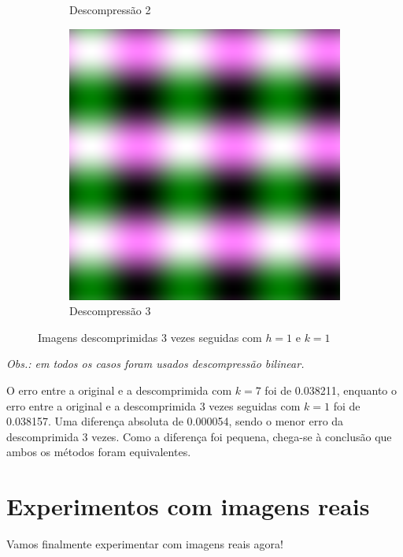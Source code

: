 \documentclass{article}
\begin{document}
\begin{figure}[ht]
\begin{subfigure}{0.3\textwidth}
    \caption{Descompressão 2}
  \end{subfigure}%
  \hfill
  \begin{subfigure}{0.3\textwidth}
    \centering
    \includegraphics[width=\textwidth]{senoidal/decompress3vezes/decompressed3.png}
    \caption{Descompressão 3}
  \end{subfigure}%
  \caption{Imagens descomprimidas 3 vezes seguidas com $h=1$ e $k=1$}
\end{figure}

\newpage

\textit{Obs.: em todos os casos foram usados descompressão bilinear.}

O erro entre a original e a descomprimida com $k=7$ foi de 0.038211, enquanto
o erro entre a original e a descomprimida 3 vezes seguidas com $k=1$ foi de
0.038157. Uma diferença absoluta de 0.000054, sendo o menor erro da descomprimida
3 vezes. Como a diferença foi pequena, chega-se à conclusão que ambos os métodos
foram equivalentes.

\section{Experimentos com imagens reais}

Vamos finalmente experimentar com imagens reais agora!
\end{document}
